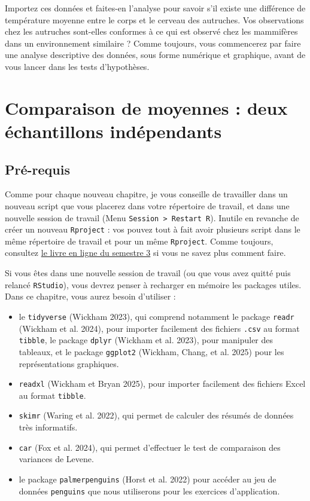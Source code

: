 \documentclass[
  french,
  a4paper,
  DIV=11,
  numbers=noendperiod,
  oneside]{scrreprt}
\providecommand{\tightlist}{%
  \setlength{\itemsep}{0pt}\setlength{\parskip}{0pt}}
\begin{document}
Importez ces données et faites-en l'analyse pour savoir s'il existe une
différence de température moyenne entre le corps et le cerveau des
autruches. Vos observations chez les autruches sont-elles conformes à ce
qui est observé chez les mammifères dans un environnement similaire ?
Comme toujours, vous commencerez par faire une analyse descriptive des
données, sous forme numérique et graphique, avant de vous lancer dans
les tests d'hypothèses.


\chapter{Comparaison de moyennes : deux échantillons
indépendants}\label{sec-moy3}

\section{Pré-requis}\label{sec-packages3}

Comme pour chaque nouveau chapitre, je vous conseille de travailler dans
un nouveau script que vous placerez dans votre répertoire de travail, et
dans une nouvelle session de travail (Menu
\texttt{Session\ \textgreater{}\ Restart\ R}). Inutile en revanche de
créer un nouveau \texttt{Rproject} : vos pouvez tout à fait avoir
plusieurs script dans le même répertoire de travail et pour un même
\texttt{Rproject}. Comme toujours, consultez
\href{https://besibo.github.io/BiometrieS3/01-R-basics.html\#sec-code}{le
livre en ligne du semestre 3} si vous ne savez plus comment faire.

Si vous êtes dans une nouvelle session de travail (ou que vous avez
quitté puis relancé \texttt{RStudio}), vous devrez penser à recharger en
mémoire les packages utiles. Dans ce chapitre, vous aurez besoin
d'utiliser :

\begin{itemize}
\tightlist
\item
  le \texttt{tidyverse} (Wickham 2023), qui comprend notamment le
  package \texttt{readr} (Wickham et al. 2024), pour importer facilement
  des fichiers \texttt{.csv} au format \texttt{tibble}, le package
  \texttt{dplyr} (Wickham et al. 2023), pour manipuler des tableaux, et
  le package \texttt{ggplot2} ({Wickham, Chang, et al.} 2025) pour les
  représentations graphiques.
\item
  \texttt{readxl} (Wickham et Bryan 2025), pour importer facilement des
  fichiers Excel au format \texttt{tibble}.
\item
  \texttt{skimr} (Waring et al. 2022), qui permet de calculer des
  résumés de données très informatifs.
\item
  \texttt{car} (Fox et al. 2024), qui permet d'effectuer le test de
  comparaison des variances de Levene.
\item
  le package \texttt{palmerpenguins} (Horst et al. 2022) pour accéder au
  jeu de données \texttt{penguins} que nous utiliserons pour les
  exercices d'application.
\end{itemize}
\end{document}

